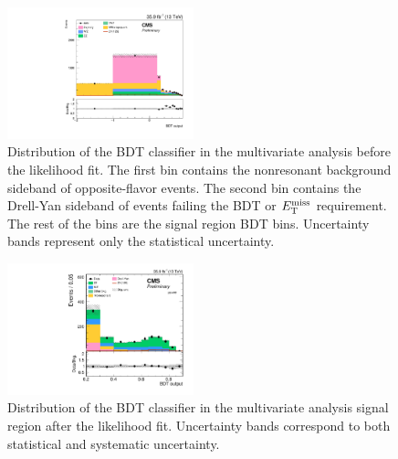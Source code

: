 \begin{figure}[htbp]
\begin{center}
\includegraphics[width=0.48\textwidth]{figures/bdt_zh_prefit.pdf}
\caption{Distribution of the BDT classifier in the multivariate analysis before the likelihood fit. The first bin contains the nonresonant background sideband of opposite-flavor events. The second bin contains the Drell-Yan sideband of events failing the BDT or $E_\mathrm{T}^{\mathrm{miss}}$ requirement. The rest of the bins are the signal region BDT bins. Uncertainty bands represent only the statistical uncertainty.}
\label{fig:bdt_zh_prefit}
\end{center}
\end{figure}

\begin{figure}[htbp]
\begin{center}
\includegraphics[width=0.48\textwidth]{figures/fullsel_bdt_ll_postfit.pdf}
\caption{Distribution of the BDT classifier in the multivariate analysis signal region after the likelihood fit. Uncertainty bands correspond to both statistical and systematic uncertainty.}
\label{fig:bdt_zh}
\end{center}
\end{figure}

